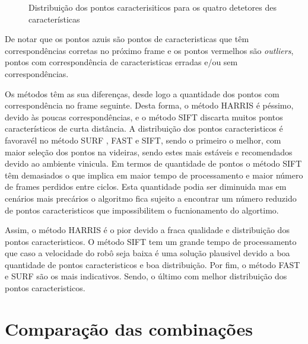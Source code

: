 \begin{figure}[h!]
	\centering
	\qquad

	\qquad
	\caption{Distribuição dos pontos caracterisiticos para os quatro detetores des características}\label{fig:metodosALL}
\end{figure}


De notar que os pontos azuis são pontos de caracteristicas que têm correspondências corretas no próximo frame e os pontos vermelhos são \textit{outliers}, pontos com correspondência de caracteristicas erradas e/ou sem correspondências.

Os métodos têm as sua diferenças, desde logo a quantidade dos pontos com correspondência no frame seguinte. Desta forma, o método HARRIS é péssimo, devido às poucas correspondências, e o método SIFT discarta muitos pontos característicos de curta distância. A distribuição dos pontos caracteristicos é favoravél no método SURF , FAST e SIFT, sendo o primeiro o melhor, com maior seleção dos pontos na videiras, sendo estes mais estáveis e recomendados devido ao ambiente vinicula. Em termos de quantidade de pontos o método SIFT têm demasiados o que implica em maior tempo de processamento e maior número de frames perdidos entre ciclos. Esta quantidade podia ser diminuida mas em cenários 
mais precários o algoritmo fica sujeito a encontrar um número reduzido de pontos caracteristicos que impossibilitem o fucnionamento do algortimo. 

Assim, o método HARRIS é o pior devido a fraca qualidade e distribuição dos pontos caracteristicos. O método SIFT tem um grande tempo de processamento que caso a velocidade do robô seja baixa é uma solução plausivel devido a boa quantidade de pontos caracteristicos e boa distribuição. Por fim, o método FAST e SURF são os mais indicativos. Sendo, o último com melhor distribuição  dos pontos caracteristicos. 


\section{Comparação das combinações}\label{sec:Tempos}


